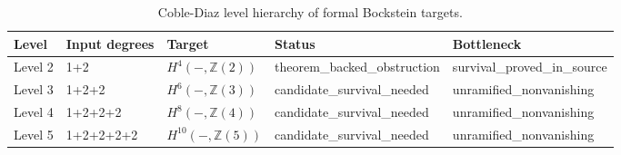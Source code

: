 \begin{table}[h]
\centering
\caption{Coble-Diaz level hierarchy of formal Bockstein targets.}
\label{tab:coble-diaz-hierarchy}
\footnotesize
\begin{tabular}{|p{}|p{}|p{}|p{}|p{}|}
\hline
Level & Input degrees & Target & Status & Bottleneck \\
\hline
Level 2 & 1+2 & $H^4(-,\mathbb{Z}(2))$ & theorem\_\allowbreak{}backed\_\allowbreak{}obstruction & survival\_\allowbreak{}proved\_\allowbreak{}in\_\allowbreak{}source \\
Level 3 & 1+2+2 & $H^6(-,\mathbb{Z}(3))$ & candidate\_\allowbreak{}survival\_\allowbreak{}needed & unramified\_\allowbreak{}nonvanishing \\
Level 4 & 1+2+2+2 & $H^8(-,\mathbb{Z}(4))$ & candidate\_\allowbreak{}survival\_\allowbreak{}needed & unramified\_\allowbreak{}nonvanishing \\
Level 5 & 1+2+2+2+2 & $H^10(-,\mathbb{Z}(5))$ & candidate\_\allowbreak{}survival\_\allowbreak{}needed & unramified\_\allowbreak{}nonvanishing \\
\hline
\end{tabular}
\end{table}
